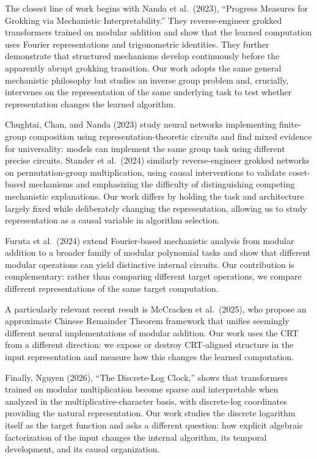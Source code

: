 \documentclass[9pt,a4paper]{extarticle}
\begin{document}
The closest line of work begins with Nanda et al.\ (2023), ``Progress Measures for Grokking via Mechanistic Interpretability.'' They reverse-engineer grokked transformers trained on modular addition and show that the learned computation uses Fourier representations and trigonometric identities. They further demonstrate that structured mechanisms develop continuously before the apparently abrupt grokking transition. Our work adopts the same general mechanistic philosophy but studies an inverse group problem and, crucially, intervenes on the representation of the same underlying task to test whether representation changes the learned algorithm.

Chughtai, Chan, and Nanda (2023) study neural networks implementing finite-group composition using representation-theoretic circuits and find mixed evidence for universality: models can implement the same group task using different precise circuits. Stander et al.\ (2024) similarly reverse-engineer grokked networks on permutation-group multiplication, using causal interventions to validate coset-based mechanisms and emphasizing the difficulty of distinguishing competing mechanistic explanations. Our work differs by holding the task and architecture largely fixed while deliberately changing the representation, allowing us to study representation as a causal variable in algorithm selection.

Furuta et al.\ (2024) extend Fourier-based mechanistic analysis from modular addition to a broader family of modular polynomial tasks and show that different modular operations can yield distinctive internal circuits. Our contribution is complementary: rather than comparing different target operations, we compare different representations of the same target computation.

A particularly relevant recent result is McCracken et al.\ (2025), who propose an approximate Chinese Remainder Theorem framework that unifies seemingly different neural implementations of modular addition. Our work uses the CRT from a different direction: we expose or destroy CRT-aligned structure in the input representation and measure how this changes the learned computation.

Finally, Nguyen (2026), ``The Discrete-Log Clock,'' shows that transformers trained on modular multiplication become sparse and interpretable when analyzed in the multiplicative-character basis, with discrete-log coordinates providing the natural representation. Our work studies the discrete logarithm itself as the target function and asks a different question: how explicit algebraic factorization of the input changes the internal algorithm, its temporal development, and its causal organization.
\end{document}
